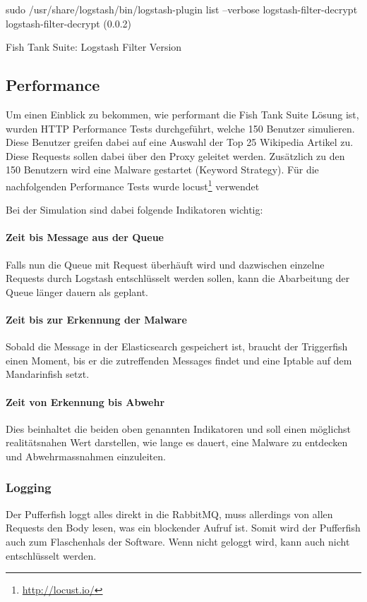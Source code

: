 \begin{listing}[H]
\begin{fancycode}
sudo /usr/share/logstash/bin/logstash-plugin list --verbose logstash-filter-decrypt logstash-filter-decrypt (0.0.2)
\end{fancycode}
\caption{Fish Tank Suite: Logstash Filter Version}
\label{lst:logstash-filter-version}
\end{listing}


\subsection{Performance}
Um einen Einblick zu bekommen, wie performant die Fish Tank Suite Lösung ist, wurden HTTP Performance Tests durchgeführt, welche 150 Benutzer simulieren. Diese Benutzer greifen dabei auf eine Auswahl der Top 25 Wikipedia Artikel zu. Diese Requests sollen dabei über den Proxy geleitet werden.
Zusätzlich zu den 150 Benutzern wird eine Malware gestartet (Keyword Strategy).
Für die nachfolgenden Performance Tests wurde locust\cite{locust}\footnote{\url{http://locust.io/}} verwendet

Bei der Simulation sind dabei folgende Indikatoren wichtig:
\paragraph{Zeit bis Message aus der Queue} Falls nun die Queue mit Request überhäuft wird und dazwischen einzelne Requests durch Logstash entschlüsselt werden sollen, kann die Abarbeitung der Queue länger dauern als geplant.
\paragraph{Zeit bis zur Erkennung der Malware} Sobald die Message in der Elasticsearch gespeichert ist, braucht der Triggerfish einen Moment, bis er die zutreffenden Messages findet und eine Iptable auf dem Mandarinfish setzt.
\paragraph{Zeit von Erkennung bis Abwehr} Dies beinhaltet die beiden oben genannten Indikatoren und soll einen möglichst realitätsnahen Wert darstellen, wie lange es dauert, eine Malware zu entdecken und Abwehrmassnahmen einzuleiten.

\subsubsection{Logging}
Der Pufferfish loggt alles direkt in die RabbitMQ, muss allerdings von allen Requests den Body lesen, was ein blockender Aufruf ist.
Somit wird der Pufferfish auch zum Flaschenhals der Software. Wenn nicht geloggt wird, kann auch nicht entschlüsselt werden.


